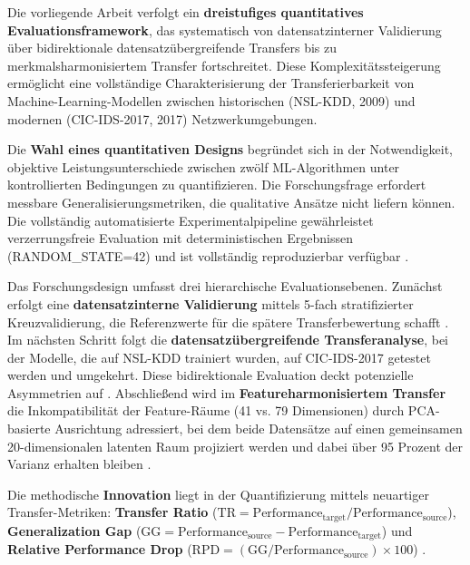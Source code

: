 \documentclass[11pt,a4paper]{article}
\begin{document}
    Die vorliegende Arbeit verfolgt ein \textbf{dreistufiges quantitatives Evaluationsframework}, das systematisch von datensatzinterner Validierung über bidirektionale datensatzübergreifende Transfers bis zu merkmalsharmonisiertem Transfer fortschreitet. Diese Komplexitätssteigerung ermöglicht eine vollständige Charakterisierung der Transferierbarkeit von Machine-Learning-Modellen zwischen historischen (NSL-KDD, 2009) und modernen (CIC-IDS-2017, 2017) Netzwerkumgebungen.

    Die \textbf{Wahl eines quantitativen Designs} begründet sich in der Notwendigkeit, objektive Leistungsunterschiede zwischen zwölf ML-Algorithmen unter kontrollierten Bedingungen zu quantifizieren. Die Forschungsfrage erfordert messbare Generalisierungsmetriken, die qualitative Ansätze nicht liefern können. Die vollständig automatisierte Experimentalpipeline gewährleistet verzerrungsfreie Evaluation mit deterministischen Ergebnissen (RANDOM\_STATE=42) und ist vollständig reproduzierbar verfügbar \parencite{Weirauch2025}.

    Das Forschungsdesign umfasst drei hierarchische Evaluationsebenen. Zunächst erfolgt eine \textbf{datensatzinterne Validierung} mittels 5-fach stratifizierter Kreuzvalidierung, die Referenzwerte für die spätere Transferbewertung schafft \parencite{Tavallaee2009}. Im nächsten Schritt folgt die \textbf{datensatzübergreifende Transferanalyse}, bei der Modelle, die auf NSL-KDD trainiert wurden, auf CIC-IDS-2017 getestet werden und umgekehrt. Diese bidirektionale Evaluation deckt potenzielle Asymmetrien auf \parencite{Ring2019}. Abschließend wird im \textbf{Featureharmonisiertem Transfer} die Inkompatibilität der Feature-Räume (41 vs. 79 Dimensionen) durch PCA-basierte Ausrichtung adressiert, bei dem beide Datensätze auf einen gemeinsamen 20-dimensionalen latenten Raum projiziert werden und dabei über 95 Prozent der Varianz erhalten bleiben \parencite{Goodfellow2016}.

    Die methodische \textbf{Innovation} liegt in der Quantifizierung mittels neuartiger Transfer-Metriken: \textbf{Transfer Ratio} ($\text{TR} = \text{Performance}_{\text{target}} / \text{Performance}_{\text{source}}$), \textbf{Generalization Gap} ($\text{GG} = \text{Performance}_{\text{source}} - \text{Performance}_{\text{target}}$) und \textbf{Relative Performance Drop} ($\text{RPD} = (\text{GG} / \text{Performance}_{\text{source}}) \times 100$) \parencite{Mourouzis2021}.
\end{document}
